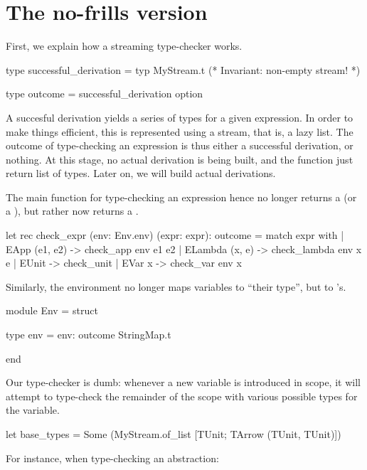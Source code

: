 \section{The no-frills version}

First, we explain how a streaming type-checker works.

\begin{ocamlcode}
type successful_derivation =
  typ MyStream.t (* Invariant: non-empty stream! *)

type outcome =
  successful_derivation option
\end{ocamlcode}

A succesful derivation yields a series of types for a given expression. In order
to make things efficient, this is represented using a stream, that is, a lazy
list. The outcome of type-checking an expression is thus either a successful
derivation, or nothing. At this stage, no actual derivation is being built, and
the function just return list of types. Later on, we will build actual
derivations.

The main function for type-checking an expression hence no longer returns a
 (or a ), but rather now returns a .

\begin{ocamlcode}
let rec check_expr (env: Env.env) (expr: expr): outcome =
  match expr with
  | EApp (e1, e2) ->
      check_app env e1 e2
  | ELambda (x, e) ->
      check_lambda env x e
  | EUnit ->
      check_unit
  | EVar x ->
      check_var env x
\end{ocamlcode}

Similarly, the environment no longer maps variables to ``their type'', but to
's.

\begin{ocamlcode}
module Env = struct

  type env = {
    env: outcome StringMap.t
  }

end
\end{ocamlcode}

Our type-checker is dumb: whenever a new variable is introduced in scope, it
will attempt to type-check the remainder of the scope with various possible
types for the variable.

\begin{ocamlcode}
let base_types =
  Some (MyStream.of_list [TUnit; TArrow (TUnit, TUnit)])
\end{ocamlcode}

For instance, when type-checking an abstraction:

